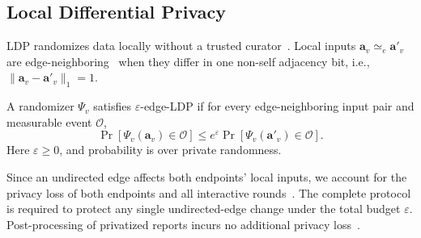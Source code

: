 
\subsection{Local Differential Privacy}
\label{subsec:ldp}

LDP randomizes data locally without a trusted curator~\cite{LDPGDDDworkRoth2014}. Local inputs $\mathbf a_v\simeq_e\mathbf a'_v$ are edge-neighboring~\cite{imola2021locally} when they differ in one non-self adjacency bit, i.e., $\|\mathbf a_v-\mathbf a'_v\|_1=1$.
\begin{definition}
\label{def:edge-ldp}
A randomizer $\Psi_v$ satisfies $\varepsilon$-edge-LDP if for every edge-neighboring input pair and measurable event $\mathcal O$,
\begin{equation}
\Pr[\Psi_v(\mathbf a_v)\in\mathcal O]\le e^{\varepsilon}\Pr[\Psi_v(\mathbf a'_v)\in\mathcal O].
\label{eq:edge-ldp-definition}
\end{equation}
Here $\varepsilon\ge0$, and probability is over private randomness.
\end{definition}

Since an undirected edge affects both endpoints' local inputs,
we account for the privacy loss of both endpoints and all
interactive rounds~\cite{imola2021locally,LDPGDDImola2022Corrected}.
The complete protocol is required to protect any single
undirected-edge change under the total budget $\varepsilon$.
Post-processing of privatized reports incurs no additional
privacy loss~\cite{LDPGDDDworkRoth2014}.





